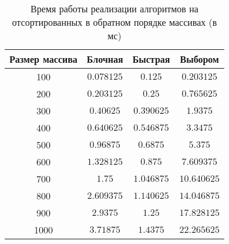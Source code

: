 \begin{table}[h]
	\begin{center}
		\begin{threeparttable}
			\captionsetup{justification=raggedright,singlelinecheck=off}
			\caption{Время работы реализации алгоритмов на отсортированных в обратном порядке массивах (в мс)}
			\label{tbl:time_measurements_sorted}
			\begin{tabular}{|c|c|c|c|}
				\hline
				Размер массива & Блочная & Быстрая & Выбором \\
				\hline
				100 &$ 0.078125 $&$ 0.125 $&$ 0.203125 $\\
				\hline
				200 &$ 0.203125 $&$ 0.25 $&$ 0.765625 $\\
				\hline
				300 &$ 0.40625 $&$ 0.390625 $&$ 1.9375 $\\
				\hline
				400 &$ 0.640625 $&$ 0.546875 $&$ 3.3475 $\\
				\hline
				500 &$ 0.96875 $&$ 0.6875 $&$ 5.375 $\\
				\hline
				600 &$ 1.328125 $&$ 0.875 $&$ 7.609375 $\\
				\hline
				700 &$ 1.75 $&$ 1.046875 $&$ 10.640625 $\\
				\hline
				800 &$ 2.609375 $&$ 1.140625 $&$ 14.046875 $\\
				\hline
				900 &$ 2.9375 $&$ 1.25 $&$ 17.828125 $\\
				\hline
				1000 &$ 3.71875 $&$ 1.4375 $&$ 22.265625 $\\
				\hline
			\end{tabular}
		\end{threeparttable}
	\end{center}
\end{table}

